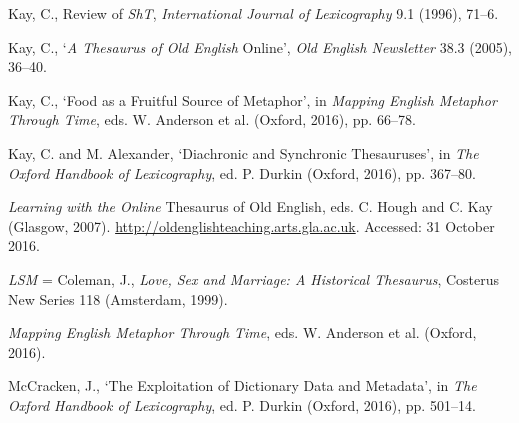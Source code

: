 \begin{list}{}


\item %
Kay, C., Review of \textit{ShT}, \textit{International Journal of Lexicography} 9.1 (1996), 71–6.

\item %
Kay, C., `\textit{A Thesaurus of Old English} Online', \textit{Old English Newsletter} 38.3 (2005), 36–40.

\item %
Kay, C., `Food as a Fruitful Source of Metaphor', in \textit{Mapping English Metaphor Through Time}, eds. W. Anderson et al. %
(Oxford, 2016), pp. 66–78.

\item %
Kay, C. and M. Alexander, `Diachronic and Synchronic Thesauruses', in \textit{The Oxford Handbook of Lexicography}, ed. P. Durkin (Oxford, 2016), pp. 367–80.


\item %
\textit{Learning with the Online }Thesaurus of Old English, eds. C. Hough and C. Kay (Glasgow, 2007). \url{http://oldenglishteaching.arts.gla.ac.uk}. Accessed: 31 October 2016.

\item %
\textit{LSM} = Coleman, J., \textit{Love, Sex and Marriage: A Historical Thesaurus}, Costerus New Series 118 (Amsterdam, 1999).

\item %
\textit{Mapping English Metaphor Through Time}, eds. W. Anderson et al. %
(Oxford, 2016).

\item %
McCracken, J., `The Exploitation of Dictionary Data and Metadata', in \textit{The Oxford Handbook of Lexicography}, ed. P. Durkin (Oxford, 2016), pp. 501–14.


\end{list}
